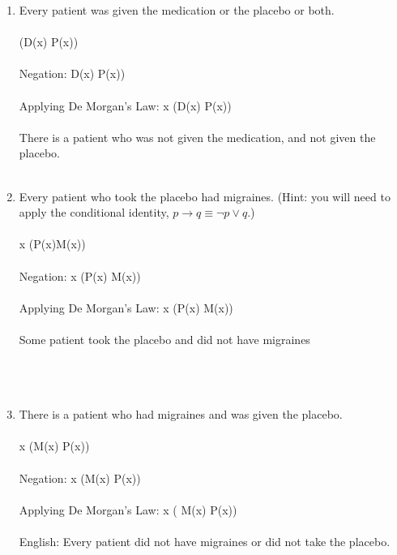 \begin{enumerate}[label=(\alph*)]

\item Every patient was given the medication or the placebo or both.\\\\
\forall (D(x) \lor P(x)) \\\\
Negation: \neg \forall D(x) \lor P(x)) \\\\

Applying De Morgan's Law: \exists x (\neg D(x) \land \neg P(x)) \\\\

There is a patient who was not given the medication, and not given the placebo.
\\\\

\item Every patient who took the placebo had migraines. (Hint: you will need to apply the conditional identity, $p \to q \equiv \neg p \lor q$.)\\\\
\forall x (P(x)\rightarrow M(x)) \\\\

Negation: \neg \forall x (P(x) \rightarrow M(x)) \\\\

Applying De Morgan's Law: \exists x (P(x) \land \neg M(x)) \\\\

Some patient took the placebo and did not have migraines \\\\
\\\\

\item There is a patient who had migraines and was given the placebo.\\\\
\exists x (M(x) \land P(x)) \\\\

Negation: \neg \exists x (M(x) \land P(x)) \\\\

Applying De Morgan's Law: \forall x ( \neg M(x) \lor \neg P(x)) \\\\

English: Every patient did not have migraines or did not take the placebo.

\\\\
\end{enumerate}

